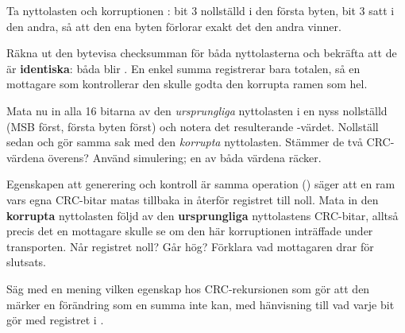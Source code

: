 Ta nyttolasten  och korruptionen : bit 3 nollställd i den första
byten, bit 3 satt i den andra, så att den ena byten förlorar exakt det den andra vinner.

 Räkna ut den bytevisa checksumman för båda nyttolasterna och bekräfta att de är
\textbf{identiska}: båda blir . En enkel summa registrerar bara totalen, så en mottagare
som kontrollerar den skulle godta den korrupta ramen som hel.

 Mata nu in alla 16 bitarna av den \emph{ursprungliga} nyttolasten i en nyss nollställd
 (MSB först, första byten först) och notera det resulterande -värdet. Nollställ
sedan och gör samma sak med den \emph{korrupta} nyttolasten. Stämmer de två CRC-värdena överens?
Använd simulering; en  av båda värdena räcker.

 Egenskapen att generering och kontroll är samma operation () säger
att en ram vars egna CRC-bitar matas tillbaka in återför registret till noll. Mata in den
\textbf{korrupta} nyttolasten följd av den \textbf{ursprungliga} nyttolastens CRC-bitar, alltså
precis det en mottagare skulle se om den här korruptionen inträffade under transporten. Når registret
noll? Går  hög? Förklara vad mottagaren drar för slutsats.

 Säg med en mening vilken egenskap hos CRC-rekursionen som gör att den märker en förändring
som en summa inte kan, med hänvisning till vad varje bit gör med registret i
.
